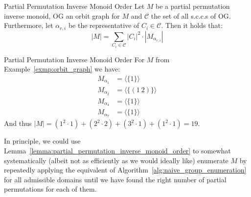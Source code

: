 \begin{corollary}[label=corollary:partial_permutation_inverse_monoid_order]{%
  Partial Permutation Inverse Monoid Order}
  Let $M$ be a partial permutation inverse monoid, $\mathrm{OG}$ an orbit graph
  for $M$ and $\mathcal{C}$ the set of all s.c.c.s of $\mathrm{OG}$. Furthermore,
  let $\alpha_{r,i}$ be the representative of $C_i \in \mathcal{C}$. Then it
  holds that:
  \begin{equation*}
    |M| = \sum_{C_i \in \mathcal{C}} |C_i|^2 \cdot |M_{\alpha_{r,i}}|
  \end{equation*}
\end{corollary}

\begin{exmp}{Partial Permutation Inverse Monoid Order}
  For $M$ from Example~\ref{exmp:orbit_graph} we have:
  \begin{align*}
    M_{\alpha_1} &= \langle \{1\} \rangle \\
    M_{\alpha_2} &= \langle \{(1\ 2)\} \rangle \\
    M_{\alpha_4} &= \langle \{1\} \rangle \\
    M_{\alpha_7} &= \langle \{1\} \rangle
  \end{align*}
  And thus $|M| = (1^2 \cdot 1) + (2^2 \cdot 2) +(3^2 \cdot 1) + (1^2 \cdot 1)
  = 19$.
\end{exmp}
%
In principle, we could use
Lemma~\ref{lemma:partial_permutation_inverse_monoid_order} to somewhat
systematically (albeit not as efficiently as we would ideally like) enumerate
$M$ by repeatedly applying the equivalent of
Algorithm~\ref{alg:naive_group_enumeration} for all admissible domains until we
have found the right number of partial permutations for each of them.
